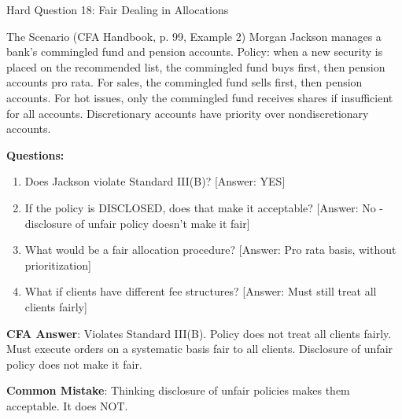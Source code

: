 \documentclass{beamer}
\begin{document}
	\begin{frame}{Hard Question 18: Fair Dealing in Allocations}
		\begin{block}{The Scenario (CFA Handbook, p. 99, Example 2)}
			Morgan Jackson manages a bank's commingled fund and pension accounts. Policy: when a new security is placed on the recommended list, the commingled fund buys first, then pension accounts pro rata. For sales, the commingled fund sells first, then pension accounts. For hot issues, only the commingled fund receives shares if insufficient for all accounts. Discretionary accounts have priority over nondiscretionary accounts.
		\end{block}
		
		\vspace{0.2cm}
		\textbf{Questions:}
		\begin{enumerate}
			\item Does Jackson violate Standard III(B)? \textcolor{cfared}{[Answer: YES]}
			\item If the policy is DISCLOSED, does that make it acceptable? \textcolor{cfared}{[Answer: No - disclosure of unfair policy doesn't make it fair]}
			\item What would be a fair allocation procedure? \textcolor{cfared}{[Answer: Pro rata basis, without prioritization]}
			\item What if clients have different fee structures? \textcolor{cfared}{[Answer: Must still treat all clients fairly]}
		\end{enumerate}
		
		\vspace{0.2cm}
		\textcolor{cfablue}{\textbf{CFA Answer}}: Violates Standard III(B). Policy does not treat all clients fairly. Must execute orders on a systematic basis fair to all clients. Disclosure of unfair policy does not make it fair.
		
		\vspace{0.1cm}
		\textcolor{cfared}{\textbf{Common Mistake}}: Thinking disclosure of unfair policies makes them acceptable. It does NOT.
	\end{frame}
	
\end{document}
